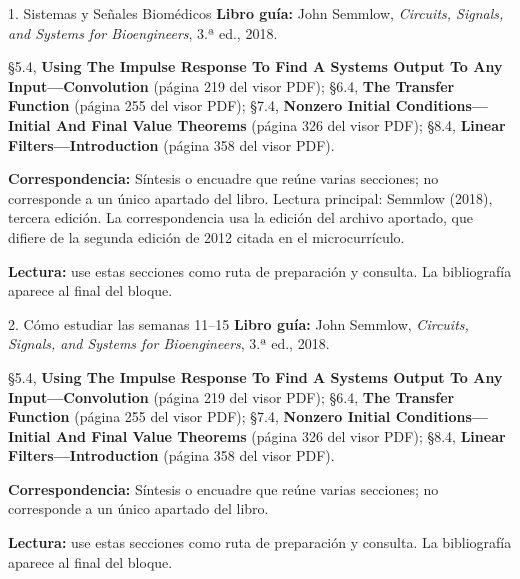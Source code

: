 \documentclass[
  10pt,
  ignorenonframetext,
  aspectratio=169,
  spanish,
]{beamer}
\begin{document}
\begin{frame}{1. Sistemas y Señales Biomédicos}
\label{sistemas-y-seuxf1ales-biomuxe9dicos-2}
\textbf{Libro guía:} John Semmlow, \emph{Circuits, Signals, and Systems
for Bioengineers}, 3.ª ed., 2018.

§5.4, \textbf{Using The Impulse Response To Find A Systems Output To Any
Input---Convolution} (página 219 del visor PDF); §6.4, \textbf{The
Transfer Function} (página 255 del visor PDF); §7.4, \textbf{Nonzero
Initial Conditions---Initial And Final Value Theorems} (página 326 del
visor PDF); §8.4, \textbf{Linear Filters---Introduction} (página 358 del
visor PDF).

\textbf{Correspondencia:} Síntesis o encuadre que reúne varias
secciones; no corresponde a un único apartado del libro. Lectura
principal: Semmlow (2018), tercera edición. La correspondencia usa la
edición del archivo aportado, que difiere de la segunda edición de 2012
citada en el microcurrículo.

\textbf{Lectura:} use estas secciones como ruta de preparación y
consulta. La bibliografía aparece al final del bloque.
\end{frame}

\begin{frame}{2. Cómo estudiar las semanas 11--15}
\label{cuxf3mo-estudiar-las-semanas-1115}
\textbf{Libro guía:} John Semmlow, \emph{Circuits, Signals, and Systems
for Bioengineers}, 3.ª ed., 2018.

§5.4, \textbf{Using The Impulse Response To Find A Systems Output To Any
Input---Convolution} (página 219 del visor PDF); §6.4, \textbf{The
Transfer Function} (página 255 del visor PDF); §7.4, \textbf{Nonzero
Initial Conditions---Initial And Final Value Theorems} (página 326 del
visor PDF); §8.4, \textbf{Linear Filters---Introduction} (página 358 del
visor PDF).

\textbf{Correspondencia:} Síntesis o encuadre que reúne varias
secciones; no corresponde a un único apartado del libro.

\textbf{Lectura:} use estas secciones como ruta de preparación y
consulta. La bibliografía aparece al final del bloque.
\end{frame}
\end{document}
